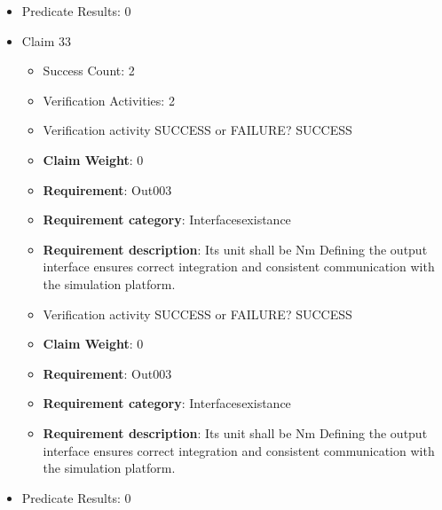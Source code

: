 \documentclass{article}
\begin{document}
\begin{itemize}
\begin{itemize}
					\item Verification activity SUCCESS or FAILURE? SUCCESS
					\item \textbf{Claim Weight}: 0
						\item \textbf{Requirement}: Out002 
						\item \textbf{Requirement category}: Interfacesexistance 
						\item \textbf{Requirement description}: Its unit shall be Nm Defining the output interface ensures correct integration and consistent communication with the simulation platform.
					
				\end{itemize}
				
									    
				\item Predicate Results: 0

  				  \item Claim 33
				\begin{itemize}
			    	\item Success Count: 2 
			    	\item Verification Activities: 2
					\item Verification activity SUCCESS or FAILURE? SUCCESS
					\item \textbf{Claim Weight}: 0
						\item \textbf{Requirement}: Out003 
						\item \textbf{Requirement category}: Interfacesexistance 
						\item \textbf{Requirement description}: Its unit shall be Nm Defining the output interface ensures correct integration and consistent communication with the simulation platform.
					
					\item Verification activity SUCCESS or FAILURE? SUCCESS
					\item \textbf{Claim Weight}: 0
						\item \textbf{Requirement}: Out003 
						\item \textbf{Requirement category}: Interfacesexistance 
						\item \textbf{Requirement description}: Its unit shall be Nm Defining the output interface ensures correct integration and consistent communication with the simulation platform.
					
				\end{itemize}
				
									    
				\item Predicate Results: 0


\end{itemize}
\end{document}
